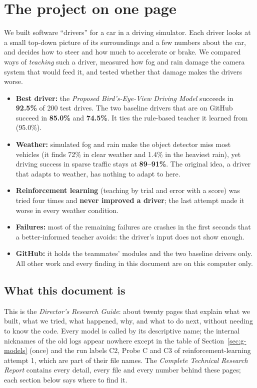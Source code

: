 \section{The project on one page}

\begin{plainwords}
We built software ``drivers'' for a car in a driving simulator. Each driver looks at a small top-down picture of its surroundings and a few numbers about the car, and decides how to steer and how much to accelerate or brake.
We compared ways of \emph{teaching} such a driver, measured how fog and rain damage the camera system that would feed it, and tested whether that damage makes the drivers worse.
\begin{itemize}[leftmargin=1.2em,itemsep=1pt]
\item \textbf{Best driver:} the \emph{Proposed Bird's-Eye-View Driving Model} succeeds in \textbf{92.5\%} of 200 test drives. The two baseline drivers that are on GitHub succeed in \textbf{85.0\%} and \textbf{74.5\%}. It ties the rule-based teacher it learned from (95.0\%).
\item \textbf{Weather:} simulated fog and rain make the object detector miss most vehicles (it finds 72\% in clear weather and 1.4\% in the heaviest rain), yet driving success in sparse traffic stays at \textbf{89--91\%}. The original idea, a driver that adapts to weather, has nothing to adapt to here.
\item \textbf{Reinforcement learning} (teaching by trial and error with a score) was tried four times and \textbf{never improved a driver}; the last attempt made it worse in every weather condition.
\item \textbf{Failures:} most of the remaining failures are crashes in the first seconds that a better-informed teacher avoids: the driver's input does not show enough.
\item \textbf{GitHub:} it holds the teammates' modules and the two baseline drivers only. All other work and every finding in this document are on this computer only.
\end{itemize}
\end{plainwords}

\subsection{What this document is}
This is the \emph{Director's Research Guide}: about twenty pages that explain what we built, what we tried, what happened, why, and what to do next, without needing to know the code. Every model is called by its descriptive name; the internal nicknames of the old logs appear nowhere except in the table of Section~\ref{sec:g-models} (once) and the run labels C2, Probe C and C3 of reinforcement-learning attempt 1, which are part of their file names. The \emph{Complete Technical Research Report} contains every detail, every file and every number behind these pages; each section below says where to find it.

